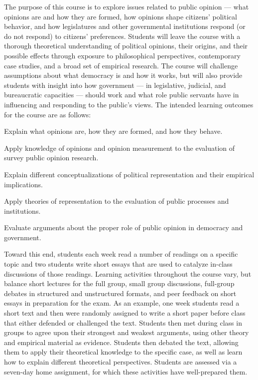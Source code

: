 \documentclass[12pt]{article}
\begin{document}
The purpose of this course is to explore issues related to public opinion --- what opinions are and how they are formed, how opinions shape citizens' political behavior, and how legislatures and other governmental institutions respond (or do not respond) to citizens' preferences. Students will leave the course with a thorough theoretical understanding of political opinions, their origins, and their possible effects through exposure to philosophical perspectives, contemporary case studies, and a broad set of empirical research. The course will challenge assumptions about what democracy is and how it works, but will also provide students with insight into how government --- in legislative, judicial, and bureaucratic capacities --- should work and what role public servants have in influencing and responding to the public's views. The intended learning outcomes for the course are as follows:

\begin{enumerate*}
\item Explain what opinions are, how they are formed, and how they behave.
\item Apply knowledge of opinions and opinion measurement to the evaluation of survey public opinion research.
\item Explain different conceptualizations of political representation and their empirical implications.
\item Apply theories of representation to the evaluation of public processes and institutions.
\item Evaluate arguments about the proper role of public opinion in democracy and government.
\end{enumerate*}

Toward this end, students each week read a number of readings on a specific topic and two students write short essays that are used to catalyze in-class discussions of those readings. Learning activities throughout the course vary, but balance short lectures for the full group, small group discussions, full-group debates in structured and unstructured formats, and peer feedback on short essays in preparation for the exam. As an example, one week students read a short text and then were randomly assigned to write a short paper before class that either defended or challenged the text. Students then met during class in groups to agree upon their strongest and weakest arguments, using other theory and empirical material as evidence. Students then debated the text, allowing them to apply their theoretical knowledge to the specific case, as well as learn how to explain different theoretical perspectives. Students are assessed via a seven-day home assignment, for which these activities have well-prepared them.
\end{document}
